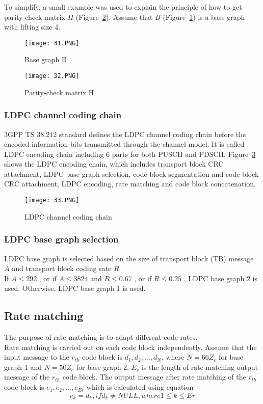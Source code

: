 To simplify, a small example was used to explain the principle of how to get parity-check matrix $H$ (Figure~\ref{fig:H parity}). Assume that $B$ (Figure~\ref{fig:B}) is a base graph with lifting size 4.

\begin{figure}[h]
\centering
\texttt{[image: 31.PNG]}
\caption{Base graph B}
\label{fig:B}
\end{figure}

\begin{figure}[h]
\centering
\texttt{[image: 32.PNG]}
\caption{Parity-check matrix H}
\label{fig:H parity}
\end{figure}

\subsubsection{LDPC channel coding chain}
3GPP TS 38.212 standard defines the LDPC channel coding chain before the encoded information bits transmitted through the channel model. It is called LDPC encoding chain including 6 parts for both PUSCH and PDSCH. Figure~\ref{fig:coding chain} shows the LDPC encoding chain, which includes transport block CRC attachment, LDPC base graph selection, code block segmentation and code block CRC attachment, LDPC encoding, rate matching and code block concatenation. 

\begin{figure}[h]
\centering
\texttt{[image: 33.PNG]}
\caption{LDPC channel coding chain}
\label{fig:coding chain}
\end{figure}

\subsubsection{LDPC base graph selection}
LDPC base graph is selected based on the size of transport block (TB) message $A$ and transport block coding rate $R$. \\
If $A \leq 292$ , or if $A \leq 3824$ and $R \leq 0.67$ , or if $R \leq 0.25$ , LDPC base graph 2 is used. 
Otherwise, LDPC base graph 1 is used.

\subsection{Rate matching}
The purpose of rate matching is to adapt different code rates. \\
Rate matching is carried out on each code block independently. Assume that the input message to the $r_{th}$ code block is $d_1, d_2, \ldots , d_N$, where $N = 66Z_c$ for base graph 1 and $N = 50Z_c$ for base graph 2. $E_r$ is the length of rate matching output message of the $r_{th}$ code block. The output message after rate matching of the $r_{th}$ code block is $e_1, e_2, \ldots , e_{Er}$ which is calculated using equation
\[e_k = d_k, if d_k \neq NULL, where  1 \leq k \leq Er\] 


